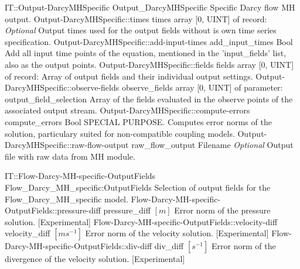 \begin{RecordType}
	{IT::Output-DarcyMHSpecific}
	{Output{\_}DarcyMHSpecific}
	{}%
	{}%
	{{{Specific Darcy flow MH output.}%
}}
		\RecKey
			{Output-DarcyMHSpecific::times}
			{times}
			{{array [0, UINT] of }{record: }}{}
			{ \it{Optional}}
			{{{Output times used for the output fields without is own time series specification.}%
}}
		\RecKey
			{Output-DarcyMHSpecific::add-input-times}
			{add{\_}input{\_}times}
			{{Bool}}{}
			{ }
			{{{Add all input time points of the equation, mentioned in the 'input{\_}fields' list, also as the output points.}%
}}
		\RecKey
			{Output-DarcyMHSpecific::fields}
			{fields}
			{{array [0, UINT] of }{record: }}{}
			{ \ValueDefault{[]}}
			{{{Array of output fields and their individual output settings.}%
}}
		\RecKey
			{Output-DarcyMHSpecific::observe-fields}
			{observe{\_}fields}
			{{array [0, UINT] of }{parameter: output{\_}field{\_}selection}}{}
			{ \ValueDefault{[]}}
			{{{Array of the fields evaluated in the observe points of the associated output stream.}%
}}
		\RecKey
			{Output-DarcyMHSpecific::compute-errors}
			{compute{\_}errors}
			{{Bool}}{}
			{ }
			{{{SPECIAL PURPOSE. Computes error norms of the solution, particulary suited for non-compatible coupling models.}%
}}
		\RecKey
			{Output-DarcyMHSpecific::raw-flow-output}
			{raw{\_}flow{\_}output}
			{{Filename}}{}
			{ \it{Optional}}
			{{{Output file with raw data from MH module.}%
}}
\end{RecordType}
\begin{SelectionType}
	{IT::Flow-Darcy-MH-specific-OutputFields}
	{Flow{\_}Darcy{\_}MH{\_}specific:OutputFields}
	{{{Selection of output fields for the Flow{\_}Darcy{\_}MH{\_}specific model.}%
}}
		\SelectionItem
			{Flow-Darcy-MH-specific-OutputFields::pressure-diff}
			{pressure{\_}diff}
			{{{}{$[m]$}{ Error norm of the pressure solution. [Experimental]}%
}}
		\SelectionItem
			{Flow-Darcy-MH-specific-OutputFields::velocity-diff}
			{velocity{\_}diff}
			{{{}{$[ms^{-1}]$}{ Error norm of the velocity solution. [Experimental]}%
}}
		\SelectionItem
			{Flow-Darcy-MH-specific-OutputFields::div-diff}
			{div{\_}diff}
			{{{}{$[s^{-1}]$}{ Error norm of the divergence of the velocity solution. [Experimental]}%
}}
\end{SelectionType}
